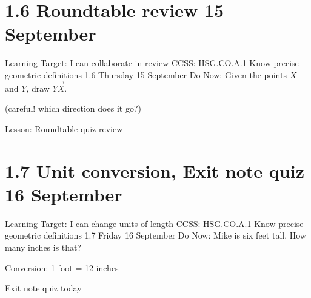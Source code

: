 \section{1.6 Roundtable review \hfill 15 September}
\begin{frame}{Learning Target: I can collaborate in review}
  {CCSS: HSG.CO.A.1 Know precise geometric definitions  \hfill \alert{1.6 Thursday 15 September}}
  Do Now: Given the points $X$ and $Y$, draw $\overrightarrow{YX}$. \par \bigskip
  (careful! which direction does it go?) 
  \vspace{1cm}
  \begin{center}
  \end{center} \vspace{1cm}
  Lesson: Roundtable quiz review
\end{frame}

\section{1.7 Unit conversion, Exit note quiz \hfill 16 September}
\begin{frame}{Learning Target: I can change units of length}
  {CCSS: HSG.CO.A.1 Know precise geometric definitions  \hfill \alert{1.7 Friday 16 September}}
  Do Now: Mike is six feet tall. How many inches is that? \par \medskip
  Conversion: 1 foot = 12 inches \par
  \vspace{3cm}
  \alert{Exit note quiz today}
  \end{frame}

